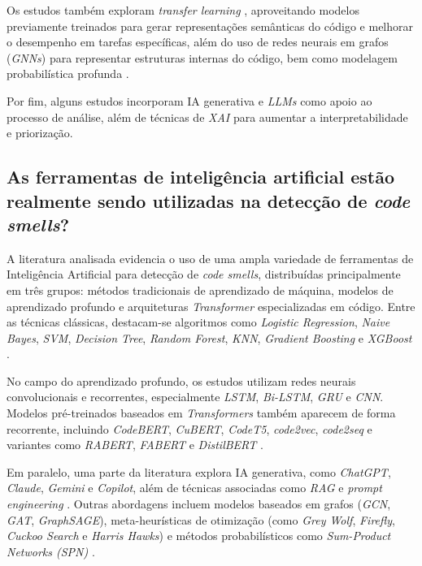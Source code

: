{Os estudos também exploram \textit{transfer learning} \cite{Sandouka2025CrossLanguage}, aproveitando modelos previamente 
treinados para gerar representações semânticas do código e melhorar o desempenho em 
tarefas específicas, além do uso de redes neurais em grafos (\textit{GNNs}) para representar 
estruturas internas do código, bem como modelagem probabilística profunda \cite{Zhang2024LargeClassGNN}.

Por fim, alguns estudos incorporam IA generativa e \textit{LLMs} como apoio ao processo de 
análise, além de técnicas de \textit{XAI} para aumentar a interpretabilidade e priorização\cite{Huang2024AligningXAI,Rashid2025InterpretableDL}.

\subsection{As ferramentas de inteligência artificial estão realmente sendo utilizadas na detecção de \textit{code smells}?}

A literatura analisada evidencia o uso de uma ampla variedade de ferramentas de 
Inteligência Artificial para detecção de \textit{code smells}, distribuídas principalmente 
em três grupos: métodos tradicionais de aprendizado de máquina, modelos de aprendizado 
profundo e arquiteturas \textit{Transformer} especializadas em código. Entre as técnicas clássicas, 
destacam-se algoritmos como \textit{Logistic Regression}, \textit{Naive Bayes}, \textit{SVM}, 
\textit{Decision Tree}, \textit{Random Forest}, \textit{KNN}, \textit{Gradient Boosting} 
e \textit{XGBoost} \cite{Sahu2024Predicting, Schuetz2023FailurePrediction}. 

No campo do aprendizado profundo, os estudos utilizam redes neurais convolucionais e 
recorrentes, especialmente \textit{LSTM}, \textit{Bi-LSTM}, \textit{GRU} e \textit{CNN}. 
Modelos pré-treinados baseados em \textit{Transformers} também aparecem de forma recorrente, incluindo 
\textit{CodeBERT}, \textit{CuBERT}, \textit{CodeT5}, \textit{code2vec}, \textit{code2seq} 
e variantes como \textit{RABERT}, \textit{FABERT} e \textit{DistilBERT} \cite{Ho2025EnseSmells,Ali2025TransformerSmells}. 

Em paralelo, uma parte da literatura explora IA generativa, como \textit{ChatGPT}, 
\textit{Claude}, \textit{Gemini} e \textit{Copilot}, além de técnicas associadas como 
\textit{RAG} e \textit{prompt engineering} \cite{Abtahi2025LLMStaticAnalysis, Tkachuk2025RefactoringGAI}. Outras abordagens incluem modelos baseados 
em grafos (\textit{GCN}, \textit{GAT}, \textit{GraphSAGE}), meta-heurísticas de otimização 
(como \textit{Grey Wolf}, \textit{Firefly}, \textit{Cuckoo Search} e \textit{Harris Hawks}) 
e métodos probabilísticos como \textit{Sum-Product Networks (SPN)} \cite{Rajput2024GreyWolfSVM, Jain2024MetaHeuristic}. 

}
